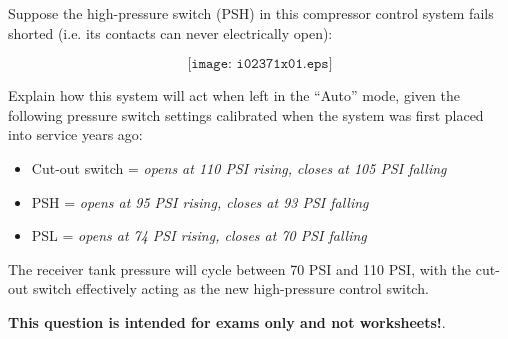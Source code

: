

Suppose the high-pressure switch (PSH) in this compressor control system fails shorted (i.e. its contacts can never electrically open):

$$\texttt{[image: i02371x01.eps]}$$

Explain how this system will act when left in the ``Auto'' mode, given the following pressure switch settings calibrated when the system was first placed into service years ago:

\begin{itemize}
\item{} Cut-out switch = {\it opens at 110 PSI rising, closes at 105 PSI falling}
\vskip 10pt
\item{} PSH = {\it opens at 95 PSI rising, closes at 93 PSI falling}
\vskip 10pt
\item{} PSL = {\it opens at 74 PSI rising, closes at 70 PSI falling}
\end{itemize}







The receiver tank pressure will cycle between 70 PSI and 110 PSI, with the cut-out switch effectively acting as the new high-pressure control switch.







{\bf This question is intended for exams only and not worksheets!}.


